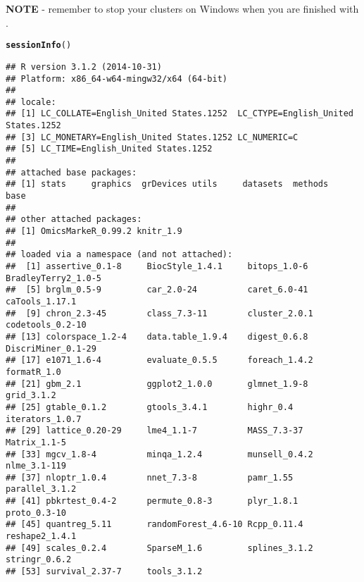 \documentclass[12pt]{article}\usepackage[]{graphicx}\usepackage[usenames,dvipsnames]{color}
\makeatletter
\newcommand{\hlstd}[1]{\textcolor[rgb]{0.345,0.345,0.345}{#1}}%
\newcommand{\hlkwd}[1]{\textcolor[rgb]{0.737,0.353,0.396}{\textbf{#1}}}%
\newenvironment{kframe}{%
 \def\at@end@of@kframe{}%
 \ifinner\ifhmode%
  \def\at@end@of@kframe{\end{minipage}}%
  \begin{minipage}{\columnwidth}%
 \fi\fi%
 \def\FrameCommand##1{\hskip\@totalleftmargin \hskip-\fboxsep
 \colorbox{shadecolor}{##1}\hskip-\fboxsep
     \hskip-\linewidth \hskip-\@totalleftmargin \hskip\columnwidth}%
 \MakeFramed {\advance\hsize-\width
   \@totalleftmargin\z@ \linewidth\hsize
   \@setminipage}}%
 {\par\unskip\endMakeFramed%
 \at@end@of@kframe}
\newenvironment{knitrout}{}{} %
\makeatother
\begin{document}
\textbf{NOTE} - remember to stop your clusters on Windows when you are finished 
with .

\newpage
\begin{knitrout}
\color{fgcolor}\begin{kframe}
\begin{alltt}
\hlkwd{sessionInfo}\hlstd{()}
\end{alltt}
\begin{verbatim}
## R version 3.1.2 (2014-10-31)
## Platform: x86_64-w64-mingw32/x64 (64-bit)
## 
## locale:
## [1] LC_COLLATE=English_United States.1252  LC_CTYPE=English_United States.1252   
## [3] LC_MONETARY=English_United States.1252 LC_NUMERIC=C                          
## [5] LC_TIME=English_United States.1252    
## 
## attached base packages:
## [1] stats     graphics  grDevices utils     datasets  methods   base     
## 
## other attached packages:
## [1] OmicsMarkeR_0.99.2 knitr_1.9         
## 
## loaded via a namespace (and not attached):
##  [1] assertive_0.1-8     BiocStyle_1.4.1     bitops_1.0-6        BradleyTerry2_1.0-5
##  [5] brglm_0.5-9         car_2.0-24          caret_6.0-41        caTools_1.17.1     
##  [9] chron_2.3-45        class_7.3-11        cluster_2.0.1       codetools_0.2-10   
## [13] colorspace_1.2-4    data.table_1.9.4    digest_0.6.8        DiscriMiner_0.1-29 
## [17] e1071_1.6-4         evaluate_0.5.5      foreach_1.4.2       formatR_1.0        
## [21] gbm_2.1             ggplot2_1.0.0       glmnet_1.9-8        grid_3.1.2         
## [25] gtable_0.1.2        gtools_3.4.1        highr_0.4           iterators_1.0.7    
## [29] lattice_0.20-29     lme4_1.1-7          MASS_7.3-37         Matrix_1.1-5       
## [33] mgcv_1.8-4          minqa_1.2.4         munsell_0.4.2       nlme_3.1-119       
## [37] nloptr_1.0.4        nnet_7.3-8          pamr_1.55           parallel_3.1.2     
## [41] pbkrtest_0.4-2      permute_0.8-3       plyr_1.8.1          proto_0.3-10       
## [45] quantreg_5.11       randomForest_4.6-10 Rcpp_0.11.4         reshape2_1.4.1     
## [49] scales_0.2.4        SparseM_1.6         splines_3.1.2       stringr_0.6.2      
## [53] survival_2.37-7     tools_3.1.2
\end{verbatim}
\end{kframe}
\end{knitrout}
\end{document}
